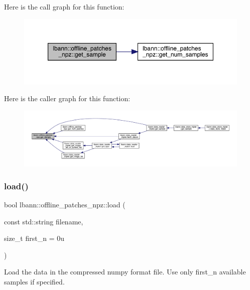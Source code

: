 Here is the call graph for this function\+:\nopagebreak
\begin{figure}[H]
\begin{center}
\leavevmode
\includegraphics[width=350pt]{classlbann_1_1offline__patches__npz_a9c8ad05ffdf0d44ee1c9b61740dd42e3_cgraph}
\end{center}
\end{figure}
Here is the caller graph for this function\+:\nopagebreak
\begin{figure}[H]
\begin{center}
\leavevmode
\includegraphics[width=350pt]{classlbann_1_1offline__patches__npz_a9c8ad05ffdf0d44ee1c9b61740dd42e3_icgraph}
\end{center}
\end{figure}
\mbox{\label{classlbann_1_1offline__patches__npz_a29f1d64e32c857018d5ef21dd99fe7c4}} 
\subsubsection{\texorpdfstring{load()}{load()}}
{\footnotesize\ttfamily bool lbann\+::offline\+\_\+patches\+\_\+npz\+::load (\begin{DoxyParamCaption}\item[{const std\+::string}]{filename,  }\item[{size\+\_\+t}]{first\+\_\+n = {\ttfamily 0u} }\end{DoxyParamCaption})}

Load the data in the compressed numpy format file. Use only first\+\_\+n available samples if specified. 

